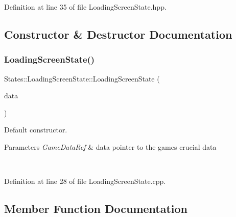 \begin{DoxyVerb}\end{DoxyVerb}
 

Definition at line 35 of file Loading\+Screen\+State.\+hpp.



\subsection{Constructor \& Destructor Documentation}
\mbox{\label{class_states_1_1_loading_screen_state_a4cbc4591072bff067015b5b959811980}} 
\subsubsection{\texorpdfstring{LoadingScreenState()}{LoadingScreenState()}}
{\footnotesize\ttfamily States\+::\+Loading\+Screen\+State\+::\+Loading\+Screen\+State (\begin{DoxyParamCaption}\item[{\mbox{\hyperlink{namespace_arktis_engine_a52e783ae007274e2a6eccc201d9400a5}{Arktis\+Engine\+::\+Game\+Data\+Ref}}}]{data }\end{DoxyParamCaption})}



Default constructor. 


\begin{DoxyParams}{Parameters}
{\em Game\+Data\+Ref} & data pointer to the game\textquotesingle{}s crucial data \begin{DoxyVerb}\end{DoxyVerb}
 \\
\hline
\end{DoxyParams}


Definition at line 28 of file Loading\+Screen\+State.\+cpp.


\begin{DoxyCode}{0}

\end{DoxyCode}


\subsection{Member Function Documentation}
\mbox{\label{class_states_1_1_loading_screen_state_ab59e574f0ccfd3471c7f919df96190a5}} 
